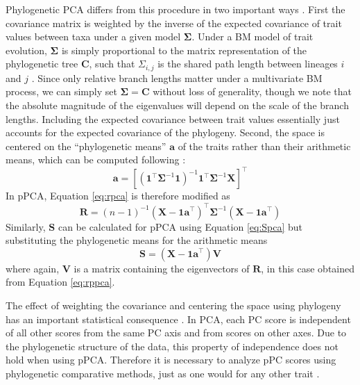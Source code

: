 \documentclass[a4paper,11pt]{article}
\begin{document}
Phylogenetic PCA differs from this procedure in two important ways \citep{Revell2008,Polly2013} . First the covariance matrix is weighted by the inverse of the expected covariance of trait values between taxa under a given model $\mathbf{\Sigma}$. Under a BM model of trait evolution, $\mathbf{\Sigma}$ is simply proportional to the matrix representation of the phylogenetic tree $\mathbf{C}$, such that $\Sigma_{i,j}$ is the shared path length between lineages $i$ and $j$ \citep{Rohlf2001}. Since only relative branch lengths matter under a multivariate BM process, we can simply set $\mathbf{\Sigma}=\mathbf{C}$ without loss of generality, though we note that the absolute magnitude of the eigenvalues will depend on the scale of the branch lengths. Including the expected covariance between trait values essentially just accounts for the expected covariance of the phylogeny. Second, the space is centered on the ``phylogenetic means'' $\mathbf{a}$ of the traits rather than their arithmetic means, which can be computed following \citet{RevellHarmon2008}:
\begin{equation}\label{eq:phymean}
\mathbf{a}=[(\mathbf{1}^\intercal \mathbf{\Sigma}^{-1} \mathbf{1})^{-1} 
\mathbf{1}^\intercal \mathbf{\Sigma}^{-1} \mathbf{X}]^\intercal
\end{equation}
In pPCA, Equation \ref{eq:rpca} is therefore modified as
\begin{equation}\label{eq:rppca}
\mathbf{R} = (n-1)^{-1}(\mathbf{X} - \mathbf{1a}^\intercal)^\intercal \mathbf{\Sigma}^{-1} (\mathbf{X} - \mathbf{1a}^\intercal)
\end{equation}
Similarly, $\mathbf{S}$ can be calculated for pPCA using Equation \ref{eq:Spca} but substituting the phylogenetic means for the arithmetic means
\begin{equation}\label{eq:Sppca}
\mathbf{S}=(\mathbf{X} - \mathbf{1a}^\intercal)\mathbf{V}
\end{equation}
where again, $\mathbf{V}$ is a matrix containing the eigenvectors of $\mathbf{R}$, in this case obtained from Equation \ref{eq:rppca}.

The effect of weighting the covariance and centering the space using phylogeny has an important statistical consequence \citep{Revell2008, Polly2013}. In PCA, each PC score is independent of all other scores from the same PC axis and from scores on other axes. Due to the phylogenetic structure of the data, this property of independence does not hold when using pPCA. Therefore it is necessary to analyze pPC scores using phylogenetic comparative methods, just as one would for any other trait \citep{Revell2008, Polly2013}. 
\end{document}
